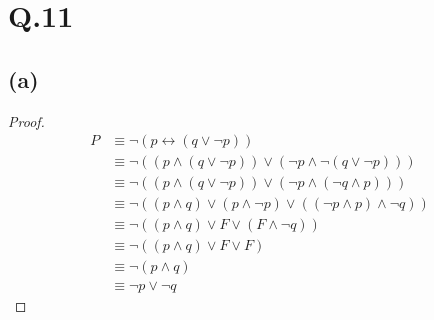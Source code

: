 \documentclass[a4paper,12pt]{article}
\begin{document}
\section*{Q.11}

\subsection*{(a)}
\begin{proof}
	\begin{align*}
		P & \equiv \neg(p \leftrightarrow (q \vee \neg p))\\
		& \equiv \neg((p \wedge (q \vee \neg p)) \vee (\neg p \wedge \neg (q \vee \neg p)))\\
		& \equiv \neg((p \wedge (q \vee \neg p)) \vee (\neg p \wedge (\neg q \wedge p)))\\
		& \equiv \neg((p \wedge q) \vee (p \wedge \neg p) \vee ((\neg p \wedge p) \wedge \neg q))\\
		& \equiv \neg((p \wedge q) \vee F \vee (F \wedge \neg q))\\
		& \equiv \neg((p \wedge q) \vee F \vee F)\\
		& \equiv \neg(p \wedge q)\\
		& \equiv \neg p \vee \neg q
	\end{align*}
\end{proof}
\end{document}
